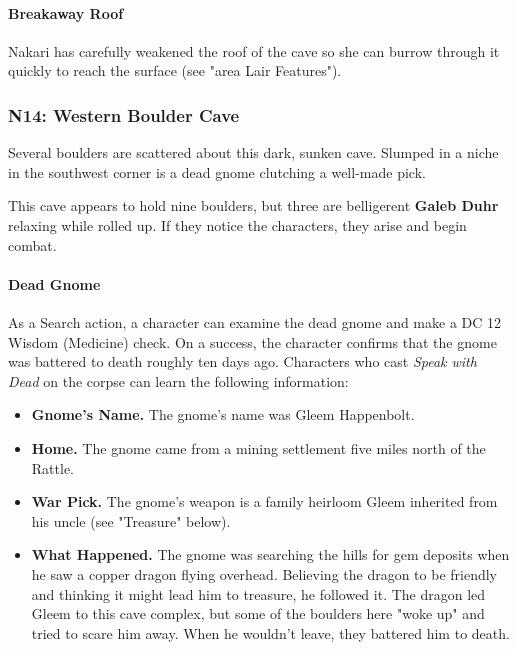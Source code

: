 \documentclass[letterpaper, 11pt, twocolumn]{dndbook}
\begin{document}
\paragraph{Breakaway Roof}

Nakari has carefully weakened the roof of the cave so she can burrow through it quickly to reach the surface (see "area Lair Features").

\subsubsection{N14: Western Boulder Cave}

\begin{DndReadAloud}
Several boulders are scattered about this dark, sunken cave. Slumped in a niche in the southwest corner is a dead gnome clutching a well-made pick.
\end{DndReadAloud}

This cave appears to hold nine boulders, but three are belligerent \textbf{Galeb Duhr} relaxing while rolled up. If they notice the characters, they arise and begin combat.

\paragraph{Dead Gnome}

As a Search action, a character can examine the dead gnome and make a DC 12 Wisdom (Medicine) check. On a success, the character confirms that the gnome was battered to death roughly ten days ago. Characters who cast \textit{Speak with Dead} on the corpse can learn the following information:

\begin{itemize}
\item \textbf{Gnome's Name.} The gnome's name was Gleem Happenbolt.
\item \textbf{Home.} The gnome came from a mining settlement five miles north of the Rattle.
\item \textbf{War Pick.} The gnome's weapon is a family heirloom Gleem inherited from his uncle (see "Treasure" below).
\item \textbf{What Happened.} The gnome was searching the hills for gem deposits when he saw a copper dragon flying overhead. Believing the dragon to be friendly and thinking it might lead him to treasure, he followed it. The dragon led Gleem to this cave complex, but some of the boulders here "woke up" and tried to scare him away. When he wouldn't leave, they battered him to death.
\end{itemize}
\end{document}
